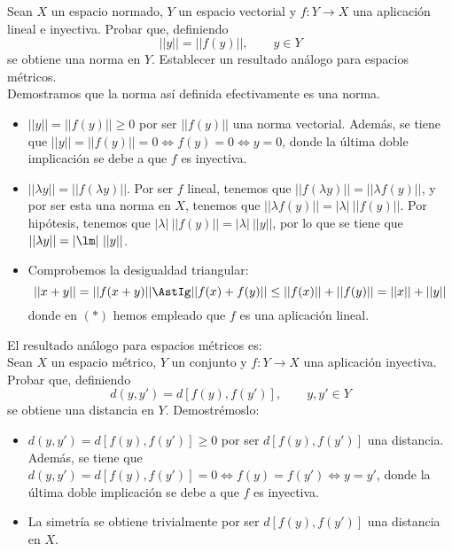 \begin{ejercicio}
    Sean $X$ un espacio normado, $Y$ un espacio vectorial y $f:Y\to X$ una aplicación lineal e inyectiva. Probar que, definiendo
    \begin{equation*}
        ||y|| = ||f(y)||, \qquad y\in Y
    \end{equation*}
    se obtiene una norma en $Y$. Establecer un resultado análogo para espacios métricos.\\

    Demostramos que la norma así definida efectivamente es una norma.
    \begin{itemize}
        \item $||y||=||f(y)||\geq 0$ por ser $||f(y)||$ una norma vectorial. Además, se tiene que  $||y||=||f(y)||=0 \Longleftrightarrow f(y)=0\Longleftrightarrow y=0$, donde la última doble implicación se debe a que $f$ es inyectiva.
        \item $||\lambda y|| = ||f(\lambda y)||$. Por ser $f$ lineal, tenemos que $||f(\lambda y)||=||\lambda f(y)||$, y por ser esta una norma en $X$, tenemos que $||\lambda f(y)|| = |\lambda|~||f(y)||$. Por hipótesis, tenemos que $|\lambda|~||f(y)|| = |\lambda|~||y||$, por lo que se tiene que $||\lambda y|| = |\lm|~||y||$.

        \item Comprobemos la desigualdad triangular:
        \begin{equation*}
            ||x+y|| = ||f(x+y)|| \AstIg ||f(x)+f(y)||\leq ||f(x)||+||f(y)|| = ||x|| + ||y||
        \end{equation*}
        donde en $(\ast)$ hemos empleado que $f$ es una aplicación lineal.
    \end{itemize}

    El resultado análogo para espacios métricos es:\\

    Sean $X$ un espacio métrico, $Y$ un conjunto y $f:Y\to X$ una aplicación inyectiva. Probar que, definiendo
    \begin{equation*}
        d(y,y') = d[f(y), f(y')], \qquad y,y'\in Y
    \end{equation*}
    se obtiene una distancia en $Y$. Demostrémoslo:
    \begin{itemize}
        \item $d(y,y') = d[f(y), f(y')]\geq 0$ por ser $d[f(y), f(y')]$ una distancia. Además, se tiene que  $d(y,y') = d[f(y), f(y')]=0 \Longleftrightarrow f(y)=f(y')\Longleftrightarrow y=y'$, donde la última doble implicación se debe a que $f$ es inyectiva.
        \item La simetría se obtiene trivialmente por ser $d[f(y), f(y')]$ una distancia en $X$.


\end{itemize}
\end{ejercicio}
